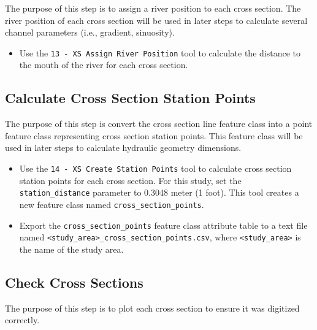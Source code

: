 \documentclass[]{book}
\providecommand{\tightlist}{%
  \setlength{\itemsep}{0pt}\setlength{\parskip}{0pt}}
\theoremstyle{definition}
\theoremstyle{definition}
\theoremstyle{definition}
\theoremstyle{remark}
\begin{document}
The purpose of this step is to assign a river position to each cross
section. The river position of each cross section will be used in later
steps to calculate several channel parameters (i.e., gradient,
sinuosity).

\begin{itemize}
\tightlist
\item
  Use the \texttt{13\ -\ XS\ Assign\ River\ Position} tool to calculate
  the distance to the mouth of the river for each cross section.
\end{itemize}

\subsection{Calculate Cross Section Station
Points}\label{calculate-cross-section-station-points}

The purpose of this step is convert the cross section line feature class
into a point feature class representing cross section station points.
This feature class will be used in later steps to calculate hydraulic
geometry dimensions.

\begin{itemize}
\tightlist
\item
  Use the \texttt{14\ -\ XS\ Create\ Station\ Points} tool to calculate
  cross section station points for each cross section. For this study,
  set the \texttt{station\_distance} parameter to 0.3048 meter (1 foot).
  This tool creates a new feature class named
  \texttt{cross\_section\_points}.
\item
  Export the \texttt{cross\_section\_points} feature class attribute
  table to a text file named
  \texttt{\textless{}study\_area\textgreater{}\_cross\_section\_points.csv},
  where \texttt{\textless{}study\_area\textgreater{}} is the name of the
  study area.
\end{itemize}

\subsection{Check Cross Sections}\label{check-cross-sections}

The purpose of this step is to plot each cross section to ensure it was
digitized correctly.
\end{document}
